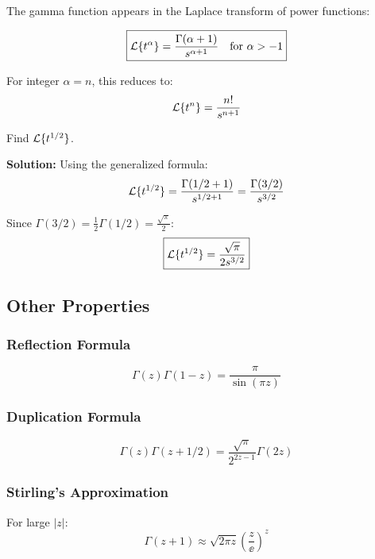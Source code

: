 The gamma function appears in the Laplace transform of power functions:

\begin{equation}
\boxed{\mathcal{L}\{t^{\alpha}\} = \frac{\Gamma(\alpha+1)}{s^{\alpha+1}} \quad \text{for } \alpha > -1}
\end{equation}

For integer $\alpha = n$, this reduces to:
\begin{equation}
\mathcal{L}\{t^n\} = \frac{n!}{s^{n+1}}
\end{equation}

\begin{examplebox}[title=Example 10.4: Laplace Transform of $t^{1/2}$]
Find $\mathcal{L}\{t^{1/2}\}$.

\textbf{Solution:}
Using the generalized formula:
\begin{equation}
\mathcal{L}\{t^{1/2}\} = \frac{\Gamma(1/2 + 1)}{s^{1/2 + 1}} = \frac{\Gamma(3/2)}{s^{3/2}}
\end{equation}

Since $\Gamma(3/2) = \frac{1}{2}\Gamma(1/2) = \frac{\sqrt{\pi}}{2}$:
\begin{equation}
\boxed{\mathcal{L}\{t^{1/2}\} = \frac{\sqrt{\pi}}{2s^{3/2}}}
\end{equation}
\end{examplebox}

\subsection{Other Properties}

\subsubsection{Reflection Formula}
\begin{equation}
\Gamma(z)\Gamma(1-z) = \frac{\pi}{\sin(\pi z)}
\end{equation}

\subsubsection{Duplication Formula}
\begin{equation}
\Gamma(z)\Gamma(z+1/2) = \frac{\sqrt{\pi}}{2^{2z-1}}\Gamma(2z)
\end{equation}

\subsubsection{Stirling's Approximation}
For large $|z|$:
\begin{equation}
\Gamma(z+1) \approx \sqrt{2\pi z}\left(\frac{z}{\ee}\right)^z
\end{equation}

